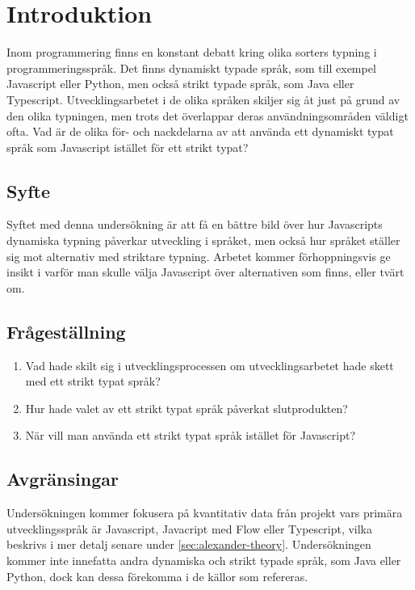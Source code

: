 \section{Introduktion}
\label{sec:alexander-introduction}
Inom programmering finns en konstant debatt kring olika sorters typning i programmeringsspråk. Det finns dynamiskt typade språk, som till exempel Javascript eller Python, men också strikt typade språk, som Java eller Typescript. Utvecklingsarbetet i de olika språken skiljer sig åt just på grund av den olika typningen, men trots det överlappar deras användningsområden väldigt ofta. Vad är de olika för- och nackdelarna av att använda ett dynamiskt typat språk som Javascript istället för ett strikt typat?

\subsection{Syfte}
\label{subsec:motivation}

Syftet med denna undersökning är att få en bättre bild över hur Javascripts dynamiska typning påverkar utveckling i språket, men också hur språket ställer sig mot alternativ med striktare typning. Arbetet kommer förhoppningsvis ge insikt i varför man skulle välja Javascript över alternativen som finns, eller tvärt om.

\subsection{Frågeställning}
\label{subsec:research-questions}

\begin{enumerate}
\item Vad hade skilt sig i utvecklingsprocessen om utvecklingsarbetet hade skett med ett strikt typat språk?

\item Hur hade valet av ett strikt typat språk påverkat slutprodukten?

\item När vill man använda ett strikt typat språk istället för Javascript?

\end{enumerate}


\subsection{Avgränsingar}
\label{subsec:delimitations}

Undersökningen kommer fokusera på kvantitativ data från projekt vars primära utvecklingsspråk är Javascript, Javacript med Flow eller Typescript, vilka beskrivs i mer detalj senare under \ref{sec:alexander-theory}. Undersökningen kommer inte innefatta andra dynamiska och strikt typade språk, som Java eller Python, dock kan dessa förekomma i de källor som refereras.




